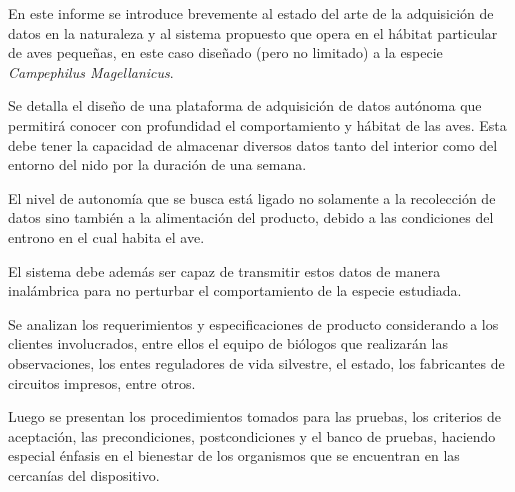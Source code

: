 %

%

En este informe se introduce brevemente al estado del arte de la adquisición de datos en la naturaleza y al sistema propuesto que opera en el hábitat particular de aves pequeñas, en este caso diseñado (pero no limitado) a la especie \textit{Campephilus Magellanicus}. 

Se detalla el diseño de una plataforma de adquisición de datos autónoma que permitirá conocer con profundidad el comportamiento y hábitat de las aves. Esta debe tener la capacidad de almacenar diversos datos tanto del interior como del entorno del nido por la duración de una semana.

El nivel de autonomía que se busca está ligado no solamente a la recolección de datos sino también a la alimentación del producto, debido a las condiciones del entrono en el cual habita el ave. 

El sistema debe además ser capaz de transmitir estos datos de manera inalámbrica para no perturbar el comportamiento de la especie estudiada.

Se analizan los requerimientos y especificaciones de producto considerando a los clientes involucrados, entre ellos el equipo de biólogos que realizarán las observaciones, los entes reguladores de vida silvestre, el estado, los fabricantes de circuitos impresos, entre otros.

Luego se presentan los procedimientos tomados para las pruebas, los criterios de aceptación, las precondiciones, postcondiciones y el banco de pruebas, haciendo especial énfasis en el bienestar de los organismos que se encuentran en las cercanías del dispositivo.

\TBC
%
